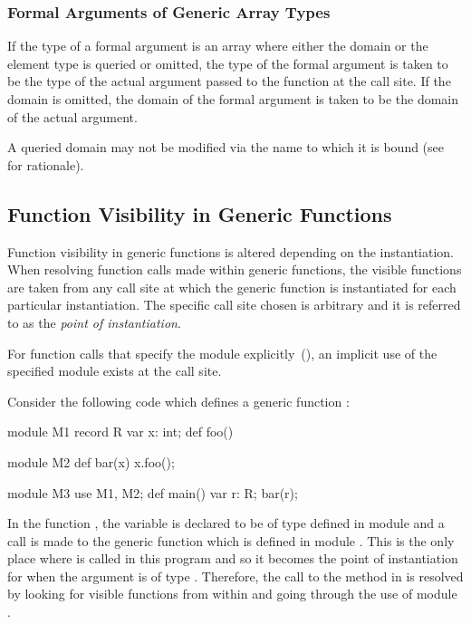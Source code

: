 \subsubsection{Formal Arguments of Generic Array Types}
\label{Formal_Arguments_of_Generic_Array_Types}

If the type of a formal argument is an array where either the domain
or the element type is queried or omitted, the type of the formal
argument is taken to be the type of the actual argument passed to the
function at the call site.  If the domain is omitted, the domain of
the formal argument is taken to be the domain of the actual argument.

A queried domain may not be modified via the name to which it is bound
(see~ for rationale).

\subsection{Function Visibility in Generic Functions}
\label{Function_Visibility_in_Generic_Functions}

Function visibility in generic functions is altered depending on the
instantiation.  When resolving function calls made within generic
functions, the visible functions are taken from any call site at which
the generic function is instantiated for each particular
instantiation.  The specific call site chosen is arbitrary and it is
referred to as the \emph{point of instantiation}.

For function calls that specify the module
explicitly~(), an implicit use of the specified
module exists at the call site.

\begin{example}
Consider the following code which defines a generic
function :
\begin{chapelpre}
\end{chapelpre}
\begin{chapel}
module M1 {
  record R {
    var x: int;
    def foo() { }
  }
}

module M2 {
  def bar(x) {
    x.foo();
  }
}

module M3 {
  use M1, M2;
  def main() {
    var r: R;
    bar(r);
  }
}
\end{chapel}
\begin{chapeloutput}
\end{chapeloutput}
In the function , the variable  is declared to be
of type  defined in module  and a call is made to the
generic function  which is defined in module .
This is the only place where  is called in this program and
so it becomes the point of instantiation for  when the
argument  is of type .  Therefore, the call to
the  method in  is resolved by looking for visible
functions from within  and going through the use of
module .
\end{example}

